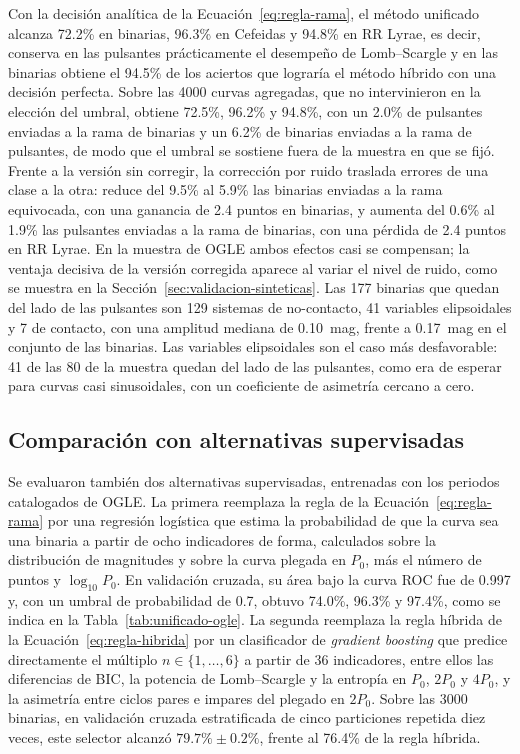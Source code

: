 \documentclass[12pt,letterpaper,oneside]{book}
\begin{document}
Con la decisi\'on anal\'itica de la Ecuaci\'on~\eqref{eq:regla-rama}, el m\'etodo unificado alcanza 72.2\% en binarias, 96.3\% en Cefeidas y 94.8\% en RR Lyrae, es decir, conserva en las pulsantes pr\'acticamente el desempe\~no de Lomb--Scargle y en las binarias obtiene el 94.5\% de los aciertos que lograr\'ia el m\'etodo h\'ibrido con una decisi\'on perfecta. Sobre las 4000 curvas agregadas, que no intervinieron en la elecci\'on del umbral, obtiene 72.5\%, 96.2\% y 94.8\%, con un 2.0\% de pulsantes enviadas a la rama de binarias y un 6.2\% de binarias enviadas a la rama de pulsantes, de modo que el umbral se sostiene fuera de la muestra en que se fij\'o. Frente a la versi\'on sin corregir, la correcci\'on por ruido traslada errores de una clase a la otra: reduce del 9.5\% al 5.9\% las binarias enviadas a la rama equivocada, con una ganancia de 2.4 puntos en binarias, y aumenta del 0.6\% al 1.9\% las pulsantes enviadas a la rama de binarias, con una p\'erdida de 2.4 puntos en RR Lyrae. En la muestra de OGLE ambos efectos casi se compensan; la ventaja decisiva de la versi\'on corregida aparece al variar el nivel de ruido, como se muestra en la Secci\'on~\ref{sec:validacion-sinteticas}. Las 177 binarias que quedan del lado de las pulsantes son 129 sistemas de no-contacto, 41 variables elipsoidales y 7 de contacto, con una amplitud mediana de 0.10~mag, frente a 0.17~mag en el conjunto de las binarias. Las variables elipsoidales son el caso m\'as desfavorable: 41 de las 80 de la muestra quedan del lado de las pulsantes, como era de esperar para curvas casi sinusoidales, con un coeficiente de asimetr\'ia cercano a cero.

\subsection{Comparaci\'on con alternativas supervisadas}

Se evaluaron tambi\'en dos alternativas supervisadas, entrenadas con los periodos catalogados de OGLE. La primera reemplaza la regla de la Ecuaci\'on~\eqref{eq:regla-rama} por una regresi\'on log\'istica que estima la probabilidad de que la curva sea una binaria a partir de ocho indicadores de forma, calculados sobre la distribuci\'on de magnitudes y sobre la curva plegada en $P_0$, m\'as el n\'umero de puntos y $\log_{10}P_0$. En validaci\'on cruzada, su \'area bajo la curva ROC fue de 0.997 y, con un umbral de probabilidad de 0.7, obtuvo 74.0\%, 96.3\% y 97.4\%, como se indica en la Tabla~\ref{tab:unificado-ogle}. La segunda reemplaza la regla h\'ibrida de la Ecuaci\'on~\eqref{eq:regla-hibrida} por un clasificador de \emph{gradient boosting} que predice directamente el m\'ultiplo $n\in\{1,\dots,6\}$ a partir de 36 indicadores, entre ellos las diferencias de BIC, la potencia de Lomb--Scargle y la entrop\'ia en $P_0$, $2P_0$ y $4P_0$, y la asimetr\'ia entre ciclos pares e impares del plegado en $2P_0$. Sobre las 3000 binarias, en validaci\'on cruzada estratificada de cinco particiones repetida diez veces, este selector alcanz\'o $79.7\%\pm0.2\%$, frente al 76.4\% de la regla h\'ibrida.
\end{document}
